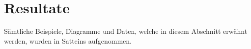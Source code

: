 \section{Resultate}
Sämtliche Beispiele, Diagramme und Daten, welche in diesem Abschnitt erwähnt werden, wurden in Satteins aufgenommen.




\newpage